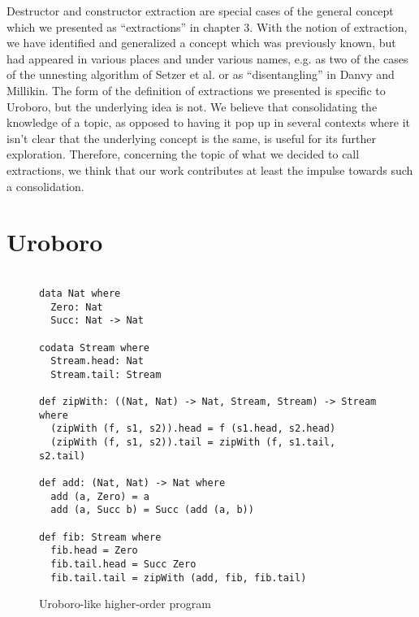 Destructor and constructor extraction are special cases of the general concept which we presented as ``extractions'' in chapter 3. With the notion of extraction, we have identified and generalized a concept which was previously known, but had appeared in various places and under various names, e.g. as two of the cases of the unnesting algorithm of Setzer et al.\cite{setzer14unnesting} or as ``disentangling'' in Danvy and Millikin\cite{danvy09refunctionalization}. The form of the definition of extractions we presented is specific to Uroboro, but the underlying idea is not. We believe that consolidating the knowledge of a topic, as opposed to having it pop up in several contexts where it isn't clear that the underlying concept is the same, is useful for its further exploration. Therefore, concerning the topic of what we decided to call extractions, we think that our work contributes at least the impulse towards such a consolidation.

\section{Uroboro}
\label{sec:reluro}

\begin{figure}
\begin{lstlisting}
  
data Nat where
  Zero: Nat
  Succ: Nat -> Nat

codata Stream where
  Stream.head: Nat
  Stream.tail: Stream

def zipWith: ((Nat, Nat) -> Nat, Stream, Stream) -> Stream where
  (zipWith (f, s1, s2)).head = f (s1.head, s2.head)
  (zipWith (f, s1, s2)).tail = zipWith (f, s1.tail, s2.tail)

def add: (Nat, Nat) -> Nat where
  add (a, Zero) = a
  add (a, Succ b) = Succ (add (a, b))

def fib: Stream where
  fib.head = Zero
  fib.tail.head = Succ Zero
  fib.tail.tail = zipWith (add, fib, fib.tail)

\end{lstlisting}
\caption{Uroboro-like higher-order program}
\label{fig:ch5uro1}
\end{figure}

